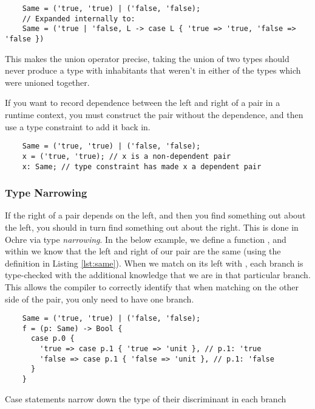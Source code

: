 \documentclass[12pt,twoside]{report}
\begin{document}
\begin{listing}[H]
  \begin{verbatim}
    Same = ('true, 'true) | ('false, 'false);
    // Expanded internally to:
    Same = ('true | 'false, L -> case L { 'true => 'true, 'false => 'false })
  \end{verbatim}
  \vspace{-0.5em}
  \caption{}
  \label{lst:same}
\end{listing}
\vspace{-1em}

This makes the union operator precise, taking the union of two types should never produce a type with inhabitants that weren't in either of the types which were unioned together.

If you want to record dependence between the left and right of a pair in a runtime context, you must construct the pair without the dependence, and then use a type constraint to add it back in.

\begin{listing}[H]
  \begin{verbatim}
    Same = ('true, 'true) | ('false, 'false);
    x = ('true, 'true); // x is a non-dependent pair
    x: Same; // type constraint has made x a dependent pair
  \end{verbatim}
\end{listing}

\subsubsection{Type Narrowing}
If the right of a pair depends on the left, and then you find something out about the left, you should in turn find something out about the right. This is done in Ochre via type \textit{narrowing}. In the below example, we define a function , and within  we know that the left and right of our pair  are the same (using the definition in Listing \ref{lst:same}). When we match on its left with , each branch is type-checked with the additional knowledge that we are in that particular branch. This allows the compiler to correctly identify that when matching on the other side of the pair, you only need to have one branch.

\begin{listing}[H]
  \begin{verbatim}
    Same = ('true, 'true) | ('false, 'false);
    f = (p: Same) -> Bool {
      case p.0 {
        'true => case p.1 { 'true => 'unit }, // p.1: 'true
        'false => case p.1 { 'false => 'unit }, // p.1: 'false
      }
    }
  \end{verbatim}
  \caption{Case statements narrow down the type of their discriminant in each branch}
\end{listing}
\end{document}

